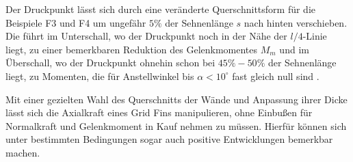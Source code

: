 Der Druckpunkt lässt sich durch eine veränderte Querschnittsform für die Beispiele F3 und F4 um ungefähr $5\%$ der Sehnenlänge $s$ nach hinten verschieben. Die führt im Unterschall, wo der Druckpunkt noch in der Nähe der $l/4$-Linie liegt, zu einer bemerkbaren Reduktion des Gelenkmomentes $M_m$ und im Überschall, wo der Druckpunkt ohnehin schon bei $45\%-50\%$ der Sehnenlänge liegt, zu Momenten, die für Anstellwinkel bis $\alpha<10^\circ$ fast gleich null sind \cite{Pattern}.

Mit einer gezielten Wahl des Querschnitts der Wände und Anpassung ihrer Dicke lässt sich die Axialkraft eines Grid Fins manipulieren, ohne Einbußen für Normalkraft und Gelenkmoment in Kauf nehmen zu müssen. Hierfür können sich unter bestimmten Bedingungen sogar auch positive Entwicklungen bemerkbar machen.

